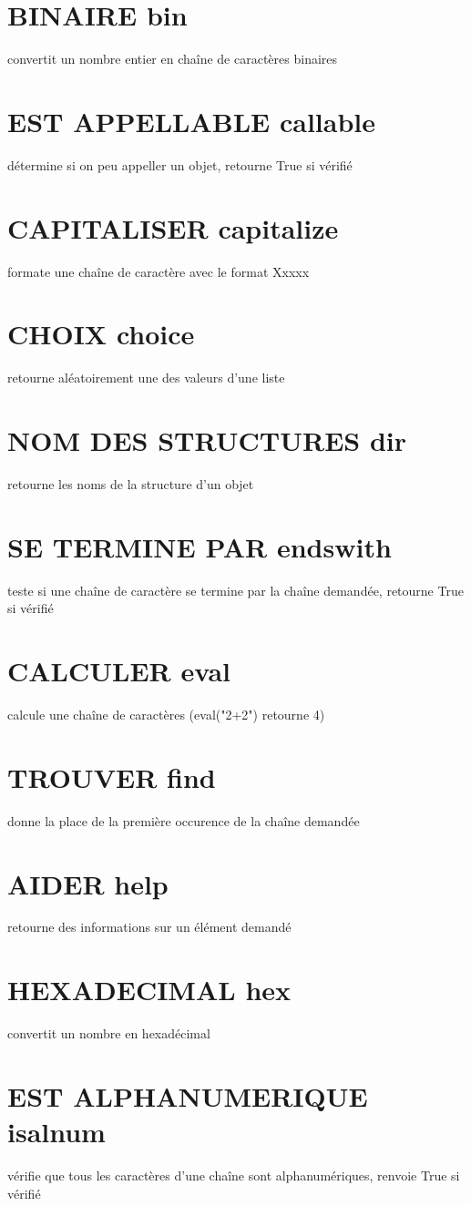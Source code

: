 \documentclass{book}
\begin{document}
\section{BINAIRE bin }
  convertit un nombre entier en chaîne de caractères binaires
\section{EST APPELLABLE callable }
  détermine si on peu appeller un objet, retourne True si vérifié
\section{CAPITALISER capitalize }
  formate une chaîne de caractère avec le format Xxxxx
\section{CHOIX choice }
  retourne aléatoirement une des valeurs d'une liste
\section{NOM DES STRUCTURES dir }
  retourne les noms de la structure d'un objet
\section{SE TERMINE PAR endswith }
  teste si une chaîne de caractère se termine par la chaîne demandée, retourne True si vérifié
\section{CALCULER eval }
  calcule une chaîne de caractères (eval("2+2") retourne 4)
\section{TROUVER find }
  donne la place de la première occurence de la chaîne demandée
\section{AIDER help }
  retourne des informations sur un élément demandé
\section{HEXADECIMAL hex }
  convertit un nombre en hexadécimal
\section{EST ALPHANUMERIQUE isalnum }
  vérifie que tous les caractères d'une chaîne sont alphanumériques, renvoie True si vérifié
\end{document}
